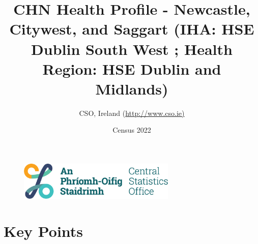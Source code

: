 \documentclass{article}
\title{CHN Health Profile - Newcastle, Citywest, and Saggart (IHA: HSE Dublin South West ;  Health Region: HSE Dublin and Midlands) }
\date{Census 2022}
\author{CSO, Ireland  (\url{http://www.cso.ie)}}
\begin{document}


\begin{figure}
	\centering
\includegraphics[width =75mm]{../figures/CSO_Logo.png}
\end{figure}

				 
		   
						  
														  
																																													
												 
			 
\maketitle
					
													   
				 
						 
																																																																											   
				 
				  
  \pagebreak
    	    \tableofcontents

\pagebreak


\section{Key Points}
\end{document}
